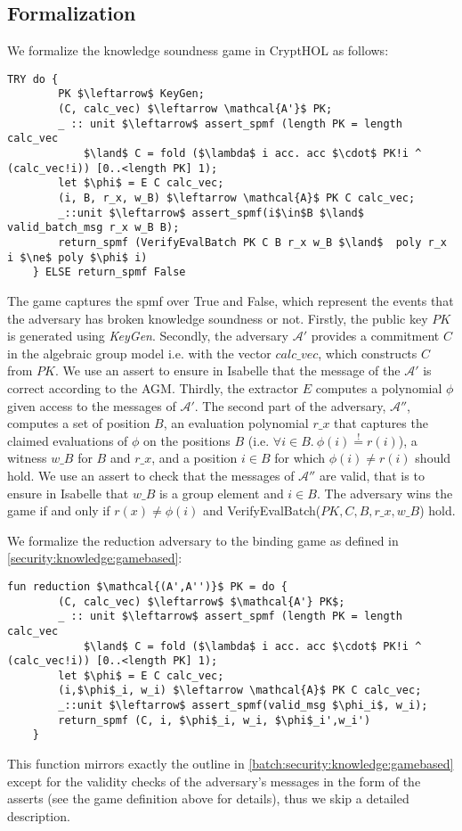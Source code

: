 \subsection*{Formalization}
We formalize the knowledge soundness game in CryptHOL as follows: 
\begin{lstlisting}[language=isabelle]
    TRY do {
        PK $\leftarrow$ KeyGen;
        (C, calc_vec) $\leftarrow \mathcal{A'}$ PK;
        _ :: unit $\leftarrow$ assert_spmf (length PK = length calc_vec 
            $\land$ C = fold ($\lambda$ i acc. acc $\cdot$ PK!i ^ (calc_vec!i)) [0..<length PK] 1);
        let $\phi$ = E C calc_vec;
        (i, B, r_x, w_B) $\leftarrow \mathcal{A}$ PK C calc_vec;
        _::unit $\leftarrow$ assert_spmf(i$\in$B $\land$ valid_batch_msg r_x w_B B);
        return_spmf (VerifyEvalBatch PK C B r_x w_B $\land$  poly r_x i $\ne$ poly $\phi$ i)
    } ELSE return_spmf False
\end{lstlisting}
The game captures the spmf over True and False, which represent the events that the adversary has broken knowledge soundness or not.
Firstly, the public key $PK$ is generated using \textit{KeyGen}. 
Secondly, the adversary $\mathcal{A'}$ provides a commitment $C$ in the algebraic group model i.e. with the vector $calc\_vec$, which constructs $C$ from $PK$. We use an assert to ensure in Isabelle that the message of the $\mathcal{A'}$ is correct according to the AGM.
Thirdly, the extractor $E$ computes a polynomial $\phi$ given access to the messages of $\mathcal{A'}$. 
The second part of the adversary, $\mathcal{A''}$, computes a set of position $B$, an evaluation polynomial $r\_x$ that captures the claimed evaluations of $\phi$ on the positions $B$ (i.e. $\forall i\in B.\ \phi(i)\stackrel{!}{=}r(i)$), a witness $w\_B$ for $B$ and $r\_x$, and a position $i\in B$ for which $\phi(i)\ne r(i)$ should hold. We use an assert to check that the messages of $\mathcal{A''}$ are valid, that is to ensure in Isabelle that $w\_B$ is a group element and $i\in B$.
The adversary wins the game if and only if $r(x) \ne \phi(i)$ and VerifyEvalBatch($PK,C,B, r\_x, w\_B$) hold.

We formalize the reduction adversary to the binding game as defined in \ref{security:knowledge:gamebased}: 
\begin{lstlisting}[language=isabelle]
    fun reduction $\mathcal{(A',A'')}$ PK = do {
        (C, calc_vec) $\leftarrow$ $\mathcal{A'} PK$;
        _ :: unit $\leftarrow$ assert_spmf (length PK = length calc_vec 
            $\land$ C = fold ($\lambda$ i acc. acc $\cdot$ PK!i ^ (calc_vec!i)) [0..<length PK] 1);
        let $\phi$ = E C calc_vec;
        (i,$\phi$_i, w_i) $\leftarrow \mathcal{A}$ PK C calc_vec;
        _::unit $\leftarrow$ assert_spmf(valid_msg $\phi_i$, w_i);
        return_spmf (C, i, $\phi$_i, w_i, $\phi$_i',w_i')
    }
\end{lstlisting}
This function mirrors exactly the outline in \ref{batch:security:knowledge:gamebased} except for the validity checks of the adversary's messages in the form of the asserts (see the game definition above for details), thus we skip a detailed description.